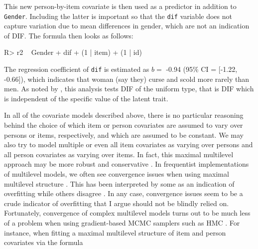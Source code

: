 \documentclass[
]{jss}
\begin{document}
\begin{CodeChunk}

\end{CodeChunk}

This new person-by-item covariate is then used as a predictor in
addition to \texttt{Gender}. Including the latter is important so that
the \texttt{dif} variable does not capture variation due to mean
differences in gender, which are not an indication of DIF. The formula
then looks as follows:

\begin{CodeChunk}

\begin{CodeInput}
R> r2 ~ Gender + dif + (1 | item) + (1 | id)
\end{CodeInput}
\end{CodeChunk}

The regression coefficient of \texttt{dif} is estimated as \(b =\) -0.94
(95\% CI = {[}-1.22, -0.66{]}), which indicates that woman (say they)
curse and scold more rarely than men. As noted by \citet{deboeck2011},
this analysis tests DIF of the uniform type, that is DIF which is
independent of the specific value of the latent trait.

In all of the covariate models described above, there is no particular
reasoning behind the choice of which item or person covariates are
assumed to vary over persons or items, respectively, and which are
assumed to be constant. We may also try to model multiple or even all
item covariates as varying over persons and all person covariates as
varying over items. In fact, this maximal multilevel approach may be
more robust and conservative \citep{barr2013}. In frequentist
implementations of multilevel models, we often see convergence issues
when using maximal multilevel structure \citep{bates2015}. This has been
interpreted by some as an indication of overfitting \citep{bates2015}
while others disagree \citep{barr2013}. In any case, convergence issues
seem to be a crude indicator of overfitting that I argue should not be
blindly relied on. Fortunately, convergence of complex multilevel models
turns out to be much less of a problem when using gradient-based MCMC
samplers such as HMC \citep{hoffman2014}. For instance, when fitting a
maximal multilevel structure of item and person covariates via the
formula
\end{document}
